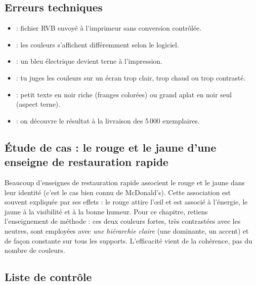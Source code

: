 \subsection{Erreurs techniques}

\begin{itemize}
  \item {} : fichier RVB envoyé à l'imprimeur sans conversion contrôlée.
  \item {} : les couleurs s'affichent différemment selon le logiciel.
  \item {} : un bleu électrique devient terne à l'impression.
  \item {} : tu juges les couleurs sur un écran trop clair, trop chaud ou trop contrasté.
  \item {} : petit texte en noir riche (franges colorées) ou grand aplat en noir seul (aspect terne).
  \item {} : on découvre le résultat à la livraison des 5\,000 exemplaires.
\end{itemize}

\subsection{Étude de cas : le rouge et le jaune d'une enseigne de restauration rapide}

Beaucoup d'enseignes de restauration rapide associent le rouge et le jaune dans leur identité (c'est le cas bien connu de McDonald's). Cette association est souvent expliquée par ses effets : le rouge attire l'œil et est associé à l'énergie, le jaune à la visibilité et à la bonne humeur. Pour ce chapitre, retiens l'enseignement de méthode : ces deux couleurs fortes, très contrastées avec les neutres, sont employées avec \emph{une hiérarchie claire} (une dominante, un accent) et de façon constante sur tous les supports. L'efficacité vient de la cohérence, pas du nombre de couleurs.

\subsection{Liste de contrôle}

